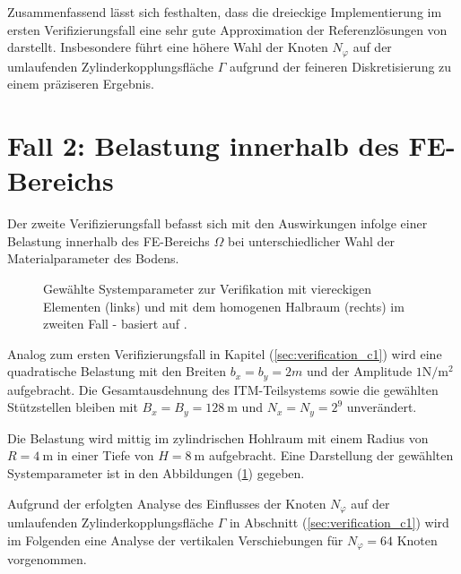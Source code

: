 Zusammenfassend lässt sich festhalten, dass die dreieckige Implementierung im ersten Verifizierungsfall eine sehr gute Approximation der Referenzlösungen von \cite{Freisinger2022} darstellt. 
Insbesondere führt eine höhere Wahl der Knoten $N_{\varphi}$ auf der umlaufenden Zylinderkopplungsfläche $\Gamma$ aufgrund der feineren Diskretisierung zu einem präziseren Ergebnis.




\section{Fall 2: Belastung innerhalb des FE-Bereichs}
\label{sec:verification_c2}

Der zweite Verifizierungsfall befasst sich mit den Auswirkungen infolge einer Belastung innerhalb des FE-Bereichs $\Omega$ bei unterschiedlicher Wahl der Materialparameter des Bodens.
\begin{figure}[H]
	\centering
	\begin{subfigure}[t]{0.49\linewidth}
		\centering
		
	\end{subfigure}\hfill
	\begin{subfigure}[t]{0.49\linewidth}
		\centering
		
	\end{subfigure}
	\caption{Gewählte Systemparameter zur Verifikation mit viereckigen Elementen (links) und mit dem homogenen Halbraum (rechts) im zweiten Fall - basiert auf \cite{Freisinger2022}.}
	\label{fig:c2_systeme}
\end{figure}
Analog zum ersten Verifizierungsfall in Kapitel (\ref{sec:verification_c1}) wird eine quadratische Belastung mit den Breiten $b_x = b_y = 2m$ und der Amplitude $1 \mathrm{N}/\mathrm{m}^{2}$ aufgebracht. Die Gesamtausdehnung des ITM-Teilsystems sowie die gewählten Stützstellen bleiben mit $B_x = B_y = 128\ \mathrm{m}$ und $N_x = N_y = 2^{9}$ unverändert.

Die Belastung wird mittig im zylindrischen Hohlraum mit einem Radius von $R = 4\ \mathrm{m}$ in einer Tiefe von $H = 8\ \mathrm{m}$ aufgebracht. Eine Darstellung der gewählten Systemparameter ist in den Abbildungen (\ref{fig:c2_systeme}) gegeben.

Aufgrund der erfolgten Analyse des Einflusses der Knoten $N_{\varphi}$ auf der umlaufenden Zylinderkopplungsfläche $\Gamma$ in Abschnitt (\ref{sec:verification_c1}) wird im Folgenden eine Analyse der vertikalen Verschiebungen für $N_{\varphi} = 64$ Knoten vorgenommen.

